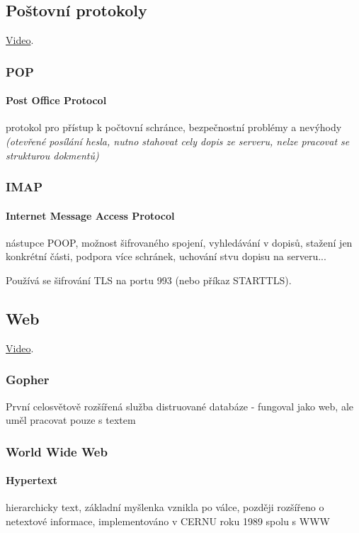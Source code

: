 \documentclass[10pt,a4paper]{article}
\begin{document}
\subsection{Poštovní protokoly}

\href{https://youtu.be/SBaARws0hy4}{Video}.

\subsubsection{POP}

\paragraph{Post Office Protocol} protokol pro přístup k počtovní schránce, bezpečnostní problémy a nevýhody \textit{(otevřené posílání hesla, nutno stahovat cely dopis ze serveru, nelze pracovat se strukturou dokmentů)}

\subsubsection{IMAP}

\paragraph{Internet Message Access Protocol} nástupce POOP, možnost šifrovaného spojení, vyhledávání v dopisů, stažení jen konkrétní části, podpora více schránek, uchování stvu dopisu na serveru...

Používá se šifrování TLS na portu 993 (nebo příkaz STARTTLS).

\subsection{Web}

\href{https://youtu.be/hExRDVZHhig}{Video}.

\subsubsection{Gopher}

První celosvětově rozšířená služba distruované databáze - fungoval jako web, ale uměl pracovat pouze s textem

\subsubsection{World Wide Web}

\paragraph{Hypertext} hierarchicky text, základní myšlenka vznikla po válce, později rozšířeno o netextové informace, implementováno v CERNU roku 1989 spolu s WWW
\end{document}
